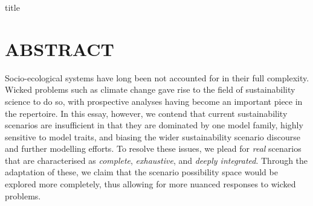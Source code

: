 \documentclass{article}
\begin{document}
{title}

\frontmatter
\tableofcontents

\mainmatter
\linenumbers

{\huge{\multiTitle}}

\section*{ABSTRACT}
Socio-ecological systems have long been not accounted for in their full complexity. Wicked problems such as climate change gave rise to the field of sustainability science to do so, with prospective analyses having become an important piece in the repertoire. In this essay, however, we contend that current sustainability scenarios are insufficient in that they are dominated by one model family, highly sensitive to model traits, and biasing the wider sustainability scenario discourse and further modelling efforts. To resolve these issues, we plead for \textit{real} scenarios that are characterised as \textit{complete}, \textit{exhaustive}, and \textit{deeply integrated}. Through the adaptation of these, we claim that the scenario possibility space would be explored more completely, thus allowing for more nuanced responses to wicked problems.





\end{document}
